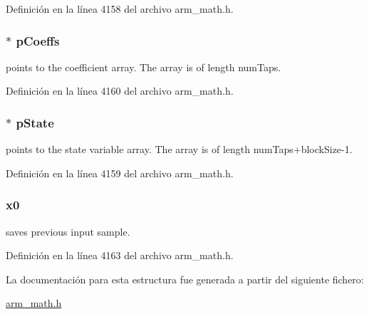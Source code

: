 Definición en la línea 4158 del archivo arm\+\_\+math.\+h.

\subsubsection[{\texorpdfstring{p\+Coeffs}{pCoeffs}}]{$\ast$ p\+Coeffs}\hypertarget{structarm__lms__norm__instance__f32_aacbb8dd8eeba4b21fc2bb40076405ee3}{}\label{structarm__lms__norm__instance__f32_aacbb8dd8eeba4b21fc2bb40076405ee3}
points to the coefficient array. The array is of length num\+Taps. 

Definición en la línea 4160 del archivo arm\+\_\+math.\+h.

\subsubsection[{\texorpdfstring{p\+State}{pState}}]{$\ast$ p\+State}\hypertarget{structarm__lms__norm__instance__f32_a335c87e6fdc4b96601d95a5de8b9c463}{}\label{structarm__lms__norm__instance__f32_a335c87e6fdc4b96601d95a5de8b9c463}
points to the state variable array. The array is of length num\+Taps+block\+Size-\/1. 

Definición en la línea 4159 del archivo arm\+\_\+math.\+h.

\subsubsection[{\texorpdfstring{x0}{x0}}]{ x0}\hypertarget{structarm__lms__norm__instance__f32_ab56b6f83c5b324c3ef620474b6e5a6e1}{}\label{structarm__lms__norm__instance__f32_ab56b6f83c5b324c3ef620474b6e5a6e1}
saves previous input sample. 

Definición en la línea 4163 del archivo arm\+\_\+math.\+h.



La documentación para esta estructura fue generada a partir del siguiente fichero\+:\begin{DoxyCompactItemize}
\item 
\hyperlink{arm__math_8h}{arm\+\_\+math.\+h}\end{DoxyCompactItemize}

